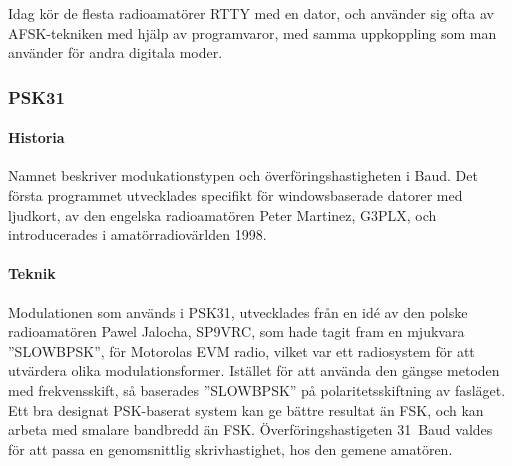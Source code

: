 Idag kör de flesta radioamatörer RTTY med en dator, och använder sig ofta av
AFSK-tekniken med hjälp av programvaror, med samma uppkoppling som man använder
för andra digitala moder.

\subsubsection{PSK31}

\paragraph{Historia}

Namnet beskriver modukationstypen och överföringshastigheten i Baud.
Det första programmet utvecklades specifikt för windowsbaserade datorer med
ljudkort, av den engelska radioamatören Peter Martinez, G3PLX, och
introducerades i amatörradiovärlden 1998.


\paragraph{Teknik}

Modulationen som används i PSK31, utvecklades från en idé av den polske
radioamatören Pawel Jalocha, SP9VRC, som hade tagit fram en mjukvara
''SLOWBPSK'', för Motorolas EVM radio, vilket var ett radiosystem för att
utvärdera olika modulationsformer.
Istället för att använda den gängse metoden med frekvensskift, så baserades
''SLOWBPSK'' på polaritetsskiftning av fasläget.
Ett bra designat PSK-baserat system kan ge bättre resultat än FSK, och kan
arbeta med smalare bandbredd än FSK.
Överföringshastigeten 31~Baud valdes för att passa en genomsnittlig
skrivhastighet, hos den gemene amatören.
